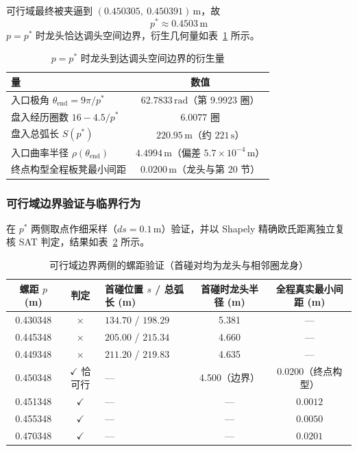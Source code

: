 ﻿\documentclass{cumcmthesis}
\begin{document}
可行域最终被夹逼到 $(0.450305,\ 0.450391)\,\text{m}$，故
\begin{equation}
\boxed{\,p^{*}\approx 0.4503\,\text{m}\,}
\end{equation}
$p=p^{*}$ 时龙头恰达调头空间边界，衍生几何量如表~\ref{tab:p3derived} 所示。

\begin{table}[H]
\centering
\caption{$p=p^{*}$ 时龙头到达调头空间边界的衍生量}
\label{tab:p3derived}
\begin{tabular}{lc}
\toprule
量 & 数值 \\
\midrule
入口极角 $\theta_{\mathrm{end}}=9\pi/p^{*}$ & $62.7833\,\text{rad}$（第 9.9923 圈） \\
盘入经历圈数 $16-4.5/p^{*}$ & $6.0077$ 圈 \\
盘入总弧长 $S(p^{*})$ & $220.95\,\text{m}$（约 $221\,\text{s}$） \\
入口曲率半径 $\rho(\theta_{\mathrm{end}})$ & $4.4994\,\text{m}$（偏差 $5.7\times10^{-4}\,\text{m}$） \\
终点构型全程板凳最小间距 & $0.0200\,\text{m}$（龙头与第 20 节） \\
\bottomrule
\end{tabular}
\end{table}

\subsubsection{可行域边界验证与临界行为}
在 $p^{*}$ 两侧取点作细采样（$ds=0.1\,\text{m}$）验证，并以 Shapely 精确欧氏距离独立复核 SAT 判定，结果如表~\ref{tab:p3verify} 所示。

\begin{table}[H]
\centering
\caption{可行域边界两侧的螺距验证（首碰对均为龙头与相邻圈龙身）}
\label{tab:p3verify}
\footnotesize
\begin{tabular}{cclcc}
\toprule
螺距 $p$ (m) & 判定 & 首碰位置 $s$ / 总弧长 (m) & 首碰时龙头半径 (m) & 全程真实最小间距 (m) \\
\midrule
0.430348 & $\times$ & $134.70$ / $198.29$ & 5.381 & — \\
0.445348 & $\times$ & $205.00$ / $215.34$ & 4.660 & — \\
0.449348 & $\times$ & $211.20$ / $219.83$ & 4.635 & — \\
$\bm{0.450348}$ & $\checkmark$ 恰可行 & — & 4.500（边界） & $0.0200$（终点构型） \\
0.451348 & $\checkmark$ & — & — & $0.0012$ \\
0.455348 & $\checkmark$ & — & — & $0.0050$ \\
0.470348 & $\checkmark$ & — & — & $0.0201$ \\
\bottomrule
\end{tabular}
\end{table}
\end{document}
